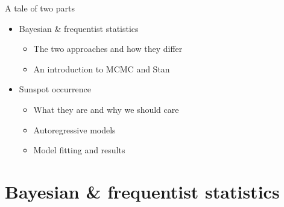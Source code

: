\documentclass[aspectratio=169]{beamer}
\begin{document}
\begin{frame}{A tale of two parts}
  \begin{itemize}
    \item Bayesian \&  frequentist statistics
    \begin{itemize}
      \item The two approaches and how they differ
      \item An introduction to MCMC and Stan
    \end{itemize}
  \end{itemize}
  \begin{itemize}
    \item Sunspot occurrence
    \begin{itemize}
      \item What they are and why we should care
      \item Autoregressive models
      \item Model fitting and results
    \end{itemize}
  \end{itemize}
\end{frame}

\section{Bayesian \& frequentist statistics}
\end{document}
